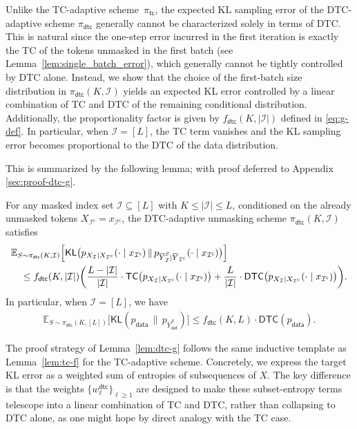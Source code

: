 \documentclass[english]{article}
\newcommand{\cI}{\mathcal{I}}
\newcommand{\KL}{\mathsf{KL}}
\newcommand{\data}{\mathsf{data}}
\newcommand{\setc}{\mathrm{c}}
\newcommand{\E}{\mathbb{E}}
\newcommand{\TC}{\mathsf{TC}}
\newcommand{\DTC}{\mathsf{DTC}}
\newcommand{\tc}{\mathsf{tc}}
\newcommand{\dtc}{\mathsf{dtc}}
\newcommand{\out}{\mathsf{out}}
\begin{document}
Unlike the TC-adaptive scheme~$\pi_{\tc}$, the expected KL sampling error of the DTC-adaptive scheme $\pi_{\dtc}$ generally cannot be characterized solely in terms of DTC.
This is natural since the one-step error incurred in the first iteration is exactly the TC of the tokens unmasked in the first batch (see Lemma~\ref{lem:single_batch_error}), which generally cannot be tightly controlled by DTC alone.
Instead, we show that the choice of the first-batch size distribution in $\pi_{\dtc}(K,\cI)$ yields an expected KL  error controlled by a linear combination of TC and DTC of the remaining conditional distribution.
Additionally, the proportionality factor is given by $f_\dtc(K, |\cI|)$ defined in \eqref{eq:g-def}.
In particular, when $\cI = [L]$, the TC term vanishes and the KL sampling error becomes proportional to the DTC of the data distribution.

This is summarized by the following lemma; with proof deferred to Appendix \ref{sec:proof-dtc-g}.
\begin{lemma}\label{lem:dtc-g}
For any masked index set $ \cI \subseteq [L]$ with $K\leq |\cI|\leq L$, conditioned on the already unmasked tokens $ X_{\cI^\mathsf{c}} =x_{\cI^\mathsf{c}}$, the DTC-adaptive unmasking scheme $\pi_{\dtc} (K,\cI)$ satisfies
\begin{align}\label{eq:dtc-g}
    &\E_{S \sim \pi_{\dtc}(K, \cI) } \Big[\KL \big(p_{X_{\cI} \mid X_{\cI^\setc}}(\cdot \mid x_{\cI^\mathsf{c}}) \,\|\, p_{\overline Y_{\cI}^S \mid \overline Y_{\cI^\setc}}(\cdot \mid x_{\cI^\mathsf{c}} ) \big) \Big] \notag \\ 
    &\quad\leq f_\dtc(K, |\cI|)\bigg(\frac{L - |\cI|}{|\cI|} \cdot\TC \big(p_{X_{\cI} \mid X_{\cI^\setc}}(\cdot \mid x_{\cI^\mathsf{c}})\big) + \frac{L}{|\cI|} \cdot\DTC \big(p_{X_{\cI} \mid X_{\cI^\setc}}(\cdot \mid x_{\cI^\mathsf{c}})\big) \bigg).
\end{align}
In particular, when $\cI = [L]$, we have
\begin{align}\label{eq:dtc-g-final}
\E_{S \sim \pi_{\dtc}(K, [L]) } \big[\KL(p_{\data} \,\|\, p_{\overline Y^S_\out} ) \big] \leq f_\dtc(K, L) \cdot \DTC(p_\data).
\end{align}
\end{lemma}


The proof strategy of Lemma~\ref{lem:dtc-g} follows the same inductive template as Lemma~\ref{lem:tc-f} for the TC-adaptive scheme. Concretely, we express the target KL error as a weighted sum of entropies of subsequences of $X$. The key difference is that the weights $\{w_\ell^\dtc\}_{\ell \geq 1}$ are designed to make these subset-entropy terms telescope into a linear combination of TC and DTC, rather than collapsing to DTC alone, as one might hope by direct analogy with the TC case.
\end{document}
